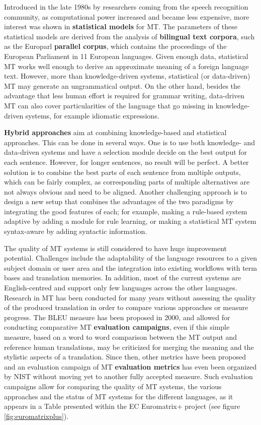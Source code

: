 \begin{multicols}{2}
Introduced in the late 1980s by researchers coming from the speech
recognition community, as computational power increased and became
less expensive, more interest was shown in {\bf statistical models} for
MT. The parameters of these statistical models are derived from the
analysis of {\bf bilingual text corpora}, such as the Europarl {\bf parallel
corpus}, which contains the proceedings of the European Parliament in
11 European languages. Given enough data, statistical MT works well
enough to derive an approximate meaning of a foreign language
text. However, more than knowledge-driven systems, statistical (or
data-driven) MT may generate an ungrammatical output. On the other
hand, besides the advantage that less human effort is required for
grammar writing, data-driven MT can also cover particularities of the
language that go missing in knowledge-driven systems, for example
idiomatic expressions.

{\bf Hybrid approaches} aim at combining knowledge-based and statistical
approaches. This can be done in several ways. One is to use both
knowledge- and data-driven systems and have a selection module decide
on the best output for each sentence. However, for longer sentences,
no result will be perfect. A better solution is to combine the best
parts of each sentence from multiple outputs, which can be fairly
complex, as corresponding parts of multiple alternatives are not
always obvious and need to be aligned. Another challenging approach is
to design a new setup that combines the advantages of the two
paradigms by integrating the good features of each; for example,
making a rule-based system adaptive by adding a module for rule
learning, or making a statistical MT system syntax-aware by adding
syntactic information.

The quality of MT systems is still considered to have huge improvement
potential. Challenges include the adaptability of the language
resources to a given subject domain or user area and the integration
into existing workflows with term bases and translation memories. In
addition, most of the current systems are English-centred and support
only few languages across the other languages. Research in MT has been
conducted for many years without assessing the quality of the produced
translation in order to compare various approaches or measure
progress. The BLEU measure has been proposed in 2000\cite{bleu02}, and allowed for
conducting comparative MT {\bf evaluation campaigns}, even if this simple
measure, based on a word to word comparison between the MT output and
reference human translations, may be criticized for merging the
meaning and the stylistic aspects of a translation. Since then, other
metrics have been proposed and an evaluation campaign of MT {\bf evaluation
metrics} has even been organized by NIST without moving yet to another
fully accepted measure. Such evaluation campaigns allow for comparing
the quality of MT systems, the various approaches and the status of MT
systems for the different languages, as it appears in a Table
presented within the EC Euromatrix+ project (see figure \ref{fig:euromatrixplus}).


\end{multicols}

